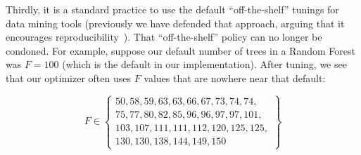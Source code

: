 \documentclass{sig-alternative}
\begin{document}
Thirdly, it is a standard practice to use the default ``off-the-shelf'' tunings  for data mining tools (previously
we have defended that approach, arguing that it
encourages reproducibility~\cite{me15:book1}). That ``off-the-shelf''  policy
can no longer be condoned. For example, suppose our default
number of trees in  a Random Forest was   $F=100$ (which is the default in our implementation).
After tuning, we see that our optimizer often uses $F$ values that are nowhere near that default:






{\scriptsize
\[F \in \left\{\begin{array}{l} 50, 58, 59, 63, 63, 66, 67, 73, 74, 74, \\
                                75, 77, 80, 82, 85, 96, 96, 97, 97, 101, \\
                                103, 107, 111, 111, 112, 120, 125, 125,  \\
                                130,130, 138, 144, 149, 150   \end{array}\right\}
\]}
\end{document}
